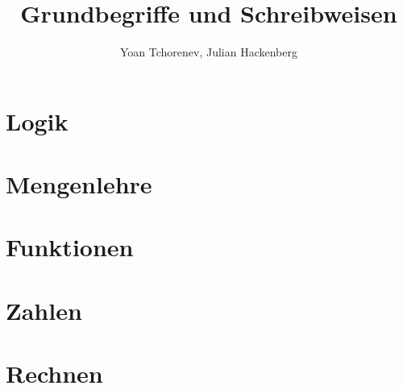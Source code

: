 \documentclass[12pt,a4paper]{article}
\title{Grundbegriffe und Schreibweisen}
\author{Yoan Tchorenev, Julian Hackenberg}
\begin{document}
    \begin{titlepage}
        \maketitle
        \tableofcontents
    \end{titlepage}


    \section{Logik}\label{sec:logik}
    


    \section{Mengenlehre}\label{sec:mengenlehre}
    


    \section{Funktionen}\label{sec:funktionen}
    


    \section{Zahlen}\label{sec:zahlen}
    


    \section{Rechnen}\label{sec:rechnen}
    
\end{document}
